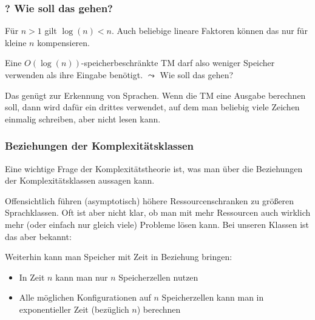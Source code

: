 \documentclass[aspectratio=1610,onlymath]{beamer}
\begin{document}
\begin{frame}\frametitle{? Wie soll das gehen?}

Für $n>1$ gilt \alert{$\log(n)<n$}. Auch beliebige lineare Faktoren können das nur für kleine $n$ kompensieren.\\
\medskip

Eine $O(\log(n))$-speicherbeschränkte TM darf also weniger Speicher verwenden als ihre Eingabe benötigt.
\alert{$\leadsto$ Wie soll das gehen?}
\bigskip\pause


{\footnotesize
Das genügt zur Erkennung von Sprachen. Wenn die TM eine Ausgabe berechnen soll, dann wird dafür ein 
drittes  verwendet, auf dem man beliebig viele Zeichen einmalig schreiben, aber nicht lesen kann.\\
}

\end{frame}

\begin{frame}\frametitle{Beziehungen der Komplexitätsklassen}

\alert{Eine wichtige Frage der Komplexitätstheorie ist, was man über die Beziehungen der
Komplexitätsklassen aussagen kann.}
\medskip\pause

Offensichtlich führen (asymptotisch) höhere Ressourcenschranken zu größeren Sprachklassen.
Oft ist aber nicht klar, ob man mit mehr Ressourcen auch wirklich mehr (oder einfach nur gleich viele) Probleme lösen kann. Bei
unseren Klassen ist das aber bekannt:\medskip

\medskip\pause

Weiterhin kann man Speicher mit Zeit in Beziehung bringen:
\begin{itemize}
\item In Zeit $n$ kann man nur $n$ Speicherzellen nutzen
\item Alle möglichen Konfigurationen auf $n$ Speicherzellen kann man in exponentieller Zeit (bezüglich $n$) berechnen
\end{itemize}


\end{frame}
\end{document}
